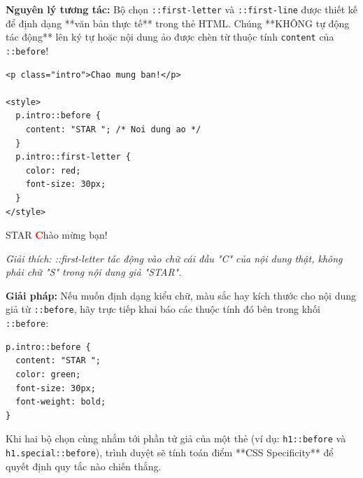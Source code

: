 \documentclass[11pt,oneside]{book}
\newcommand{\codeinline}[1]{\textcolor{accentOrange}{\texttt{#1}}}
\begin{document}
\begin{conceptBox}
\textbf{Nguyên lý tương tác:} Bộ chọn \codeinline{::first-letter} và \codeinline{::first-line} được thiết kế để định dạng **văn bản thực tế** trong thẻ HTML. Chúng **KHÔNG tự động tác động** lên ký tự hoặc nội dung ảo được chèn từ thuộc tính \codeinline{content} của \codeinline{::before}!
\end{conceptBox}

\begin{codeWindow}
\begin{lstlisting}[language=HTML5]
<p class="intro">Chao mung ban!</p>

<style>
  p.intro::before {
    content: "STAR "; /* Noi dung ao */
  }
  p.intro::first-letter {
    color: red;
    font-size: 30px;
  }
</style>
\end{lstlisting}
\end{codeWindow}

\begin{browserWindow}
\sffamily\small
STAR \textbf{\Huge\textcolor{red}{C}}hào mừng bạn! \par\vspace{2pt}
{\scriptsize\textcolor{gray!70}{\textit{Giải thích: ::first-letter tác động vào chữ cái đầu "C" của nội dung thật, không phải chữ "S" trong nội dung giả "STAR".}}}
\end{browserWindow}

\begin{tipBox}
\textbf{Giải pháp:} Nếu muốn định dạng kiểu chữ, màu sắc hay kích thước cho nội dung giả từ \codeinline{::before}, hãy trực tiếp khai báo các thuộc tính đó bên trong khối \codeinline{::before}:
\begin{codeWindow}
\begin{lstlisting}[language=CSS3]
p.intro::before {
  content: "STAR ";
  color: green;
  font-size: 30px;
  font-weight: bold;
}
\end{lstlisting}
\end{codeWindow}
\end{tipBox}

\begin{conceptBox}
Khi hai bộ chọn cùng nhắm tới phần tử giả của một thẻ (ví dụ: \codeinline{h1::before} và \codeinline{h1.special::before}), trình duyệt sẽ tính toán điểm **CSS Specificity** để quyết định quy tắc nào chiến thắng.
\end{conceptBox}
\end{document}
